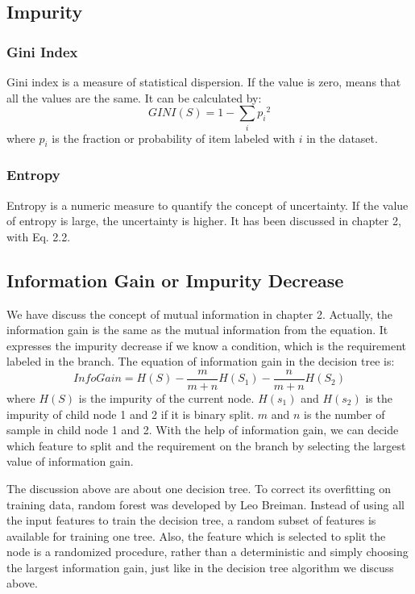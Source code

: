 \subsection{Impurity}
\subsubsection{Gini Index}
Gini index is a measure of statistical dispersion\cite{ceriani2012origins}. If the value is zero, means that all the values are the same. It can be calculated by:
\begin{equation} \label{Eq:Gini}
GINI(S) = 1-\sum_i{p_i}^2
\end{equation}
where $p_i$ is the fraction or probability of item labeled with $i$ in the dataset.
\subsubsection{Entropy}
Entropy is a numeric measure to quantify the concept of uncertainty. If the value of entropy is large, the uncertainty is higher. It has been discussed in chapter 2, with Eq. 2.2.
\subsection{Information Gain or Impurity Decrease}
We have discuss the concept of mutual information in chapter 2. Actually, the information gain is the same as the mutual information from the equation. It expresses the impurity decrease if we know a condition, which is the requirement labeled in the branch. The equation of information gain in the decision tree is:
\begin{equation} \label{informationGain}
InfoGain = H(S) - \frac{m}{m+n}H(S_1) - \frac{n}{m+n}H(S_2)
\end{equation}
where $H(S)$ is the impurity of the current node. $H(s_1)$ and $H(s_2)$ is the impurity of child node 1 and 2 if it is binary split. $m$ and $n$ is the number of sample in child node 1 and 2. With the help of information gain, we can decide which feature to split and the requirement on the branch by selecting the largest value of information gain.

The discussion above are about one decision tree. To correct its overfitting on training data, random forest was developed by Leo Breiman\cite{breiman2001random}. Instead of using all the input features to train the decision tree, a random subset of features is available for training one tree. Also, the feature which is selected to split the node is a randomized procedure, rather than a deterministic and simply choosing the largest information gain, just like in the decision tree algorithm we discuss above. 

